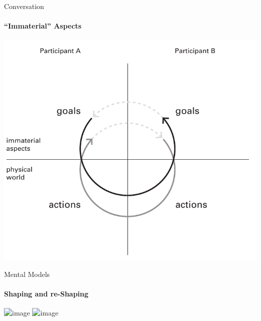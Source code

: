 \documentclass[
	11pt,
	aspectratio=169,
]{beamer}
\begin{document}
    \begin{frame}{Conversation}
        \framesubtitle{``Immaterial'' Aspects}
        \centering\includegraphics[height=0.75\textheight]{resources/interaction3.png}
    \end{frame}
    \begin{frame}{Mental Models}
        \framesubtitle{Shaping and re-Shaping}
            \centering\includegraphics<1>[width=0.75\textwidth]{resources/models6.PNG}
            \centering\includegraphics<2>[height=0.77\textheight]{resources/models7.PNG}
    \end{frame}
\end{document}
